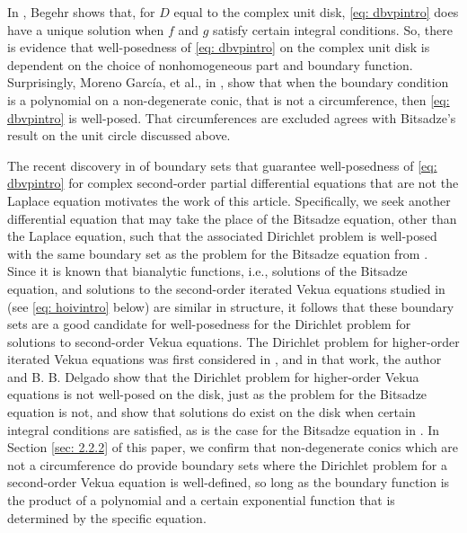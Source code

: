\documentclass[12pt,reqno]{amsart}
\theoremstyle{definition}
\theoremstyle{remark}
\begin{document}
    In \cite{Beg04}, Begehr shows that, for $D$ equal to the complex unit disk, \eqref{eq: dbvpintro} does have a unique solution when $f$ and $g$ satisfy certain integral conditions. So, there is evidence that well-posedness of \eqref{eq: dbvpintro} on the complex unit disk is dependent on the choice of nonhomogeneous part and boundary function. Surprisingly, Moreno Garc\'ia, et al., in \cite{Dirichletbianalytic}, show that when the boundary condition is a polynomial on a non-degenerate conic, that is not a circumference, then \eqref{eq: dbvpintro} is well-posed. That circumferences are excluded agrees with Bitsadze's result on the unit circle discussed above.

    The recent discovery in \cite{Dirichletbianalytic} of boundary sets that guarantee well-posedness of \eqref{eq: dbvpintro} for complex second-order partial differential equations that are not the Laplace equation motivates the work of this article. Specifically, we seek another differential equation that may take the place of the Bitsadze equation, other than the Laplace equation, such that the associated Dirichlet problem is well-posed with the same boundary set as the problem for the Bitsadze equation from \cite{Dirichletbianalytic}. Since it is known that bianalytic functions, i.e., solutions of the Bitsadze equation, and solutions to the second-order iterated Vekua equations studied in \cite{itvek, itvekbvp, metahardy, WB3, WBD, WBD2, BCHoiv} (see \eqref{eq: hoivintro} below) are similar in structure, it follows that these boundary sets are a good candidate for well-posedness for the Dirichlet problem for solutions to second-order Vekua equations. The Dirichlet problem for higher-order iterated Vekua equations was first considered in \cite{WBD2}, and in that work, the author and B. B. Delgado show that the Dirichlet problem for higher-order Vekua equations is not well-posed on the disk, just as the problem for the Bitsadze equation is not, and show that solutions do exist on the disk when certain integral conditions are satisfied, as is the case for the Bitsadze equation in \cite{Beg04}. In Section \ref{sec: 2.2.2} of this paper, we confirm that non-degenerate conics which are not a circumference do provide boundary sets where the Dirichlet problem for a second-order Vekua equation is well-defined, so long as the boundary function is the product of a polynomial and a certain exponential function that is determined by the specific equation.
\end{document}
